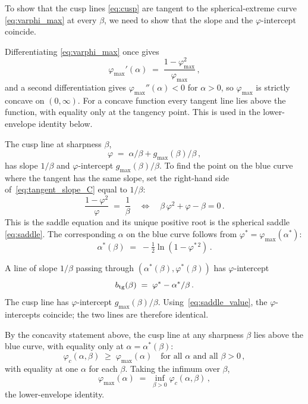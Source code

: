 \documentclass[letterpaper]{article} %
\newcommand{\Bnet}{\beta}
\begin{document}
To show that the cusp lines \eqref{eq:cusp} are tangent to the
spherical-extreme curve \eqref{eq:varphi_max} at every
$\Bnet$, we need to show that the slope and the $\varphi$-intercept
coincide.

Differentiating \eqref{eq:varphi_max} once gives
\begin{equation}
\varphi_{\max}'(\alpha) \;=\; \frac{1-\varphi_{\max}^2}{\varphi_{\max}}\,,
\label{eq:tangent_slope_C}
\end{equation}
and a second differentiation gives $\varphi_{\max}''(\alpha) < 0$ for $\alpha > 0$,
so $\varphi_{\max}$ is strictly concave on $(0, \infty)$. For a concave function
every tangent line lies above the function, with equality only at the tangency
point. This is used in the lower-envelope identity below.

The cusp line at sharpness $\Bnet$,
\begin{equation}
\varphi \;=\; \alpha/\Bnet + g_{\max}(\Bnet)/\Bnet\,,
\end{equation}
has slope $1/\Bnet$ and $\varphi$-intercept $g_{\max}(\Bnet)/\Bnet$. To find the point on
the blue curve where the tangent has the same slope, set the right-hand side
of~\eqref{eq:tangent_slope_C} equal to $1/\Bnet$:
\begin{equation}
\frac{1-\varphi^2}{\varphi} \;=\; \frac{1}{\Bnet}
\quad\Longleftrightarrow\quad
\Bnet\,\varphi^2 + \varphi - \Bnet = 0\,.
\label{eq:saddle_eq_C}
\end{equation}
This is the saddle equation and its unique positive root is the spherical saddle \eqref{eq:saddle}.
The corresponding $\alpha$ on the blue curve follows from
$\varphi^* = \varphi_{\max}(\alpha^*)$:
\begin{equation}
\alpha^*(\Bnet) \;=\; -\tfrac12 \ln(1-\varphi^{*\,2})\,.
\label{eq:alpha_star_C}
\end{equation}

A line of slope $1/\Bnet$ passing through $(\alpha^*(\Bnet), \varphi^*(\Bnet))$ has
$\varphi$-intercept
\begin{equation}
b_{\rm tg}(\Bnet) \;=\; \varphi^* - \alpha^*/\Bnet\,.
\end{equation}
The cusp line has $\varphi$-intercept $g_{\max}(\Bnet)/\Bnet$.
Using~\eqref{eq:saddle_value}, the $\varphi$-intercepts coincide;
the two lines are therefore identical.

By the concavity statement above, the cusp line at any sharpness $\Bnet$ lies above the blue curve, with equality only at
$\alpha = \alpha^*(\Bnet)$:
\begin{equation}
\varphi_c(\alpha, \Bnet) \;\ge\; \varphi_{\max}(\alpha) \quad \text{for all $\alpha$ and all $\Bnet > 0$}\,,
\end{equation}
with equality at one $\alpha$ for each $\Bnet$. Taking the infimum over $\Bnet$,
\begin{equation}
\varphi_{\max}(\alpha) \;=\; \inf_{\Bnet > 0} \varphi_c(\alpha, \Bnet)\,,
\label{eq:lower_envelope_C}
\end{equation}
the lower-envelope identity.
\end{document}
